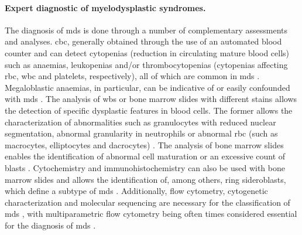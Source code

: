 \paragraph{Expert diagnostic of myelodysplastic syndromes.} The diagnosis of \ac{mds} is done through a number of complementary assessments and analyses. \Ac{cbc}, generally obtained through the use of an automated blood counter and can detect cytopenias (reduction in circulating mature blood cells) such as anaemias, leukopenias and/or thrombocytopenias (cytopenias affecting \ac{rbc}, \ac{wbc} and platelets, respectively), all of which are common in \ac{mds} \cite{Najean1989-qm,Campo2017-wi}. Megaloblastic anaemias, in particular, can be indicative of or easily confounded with \ac{mds} \cite{Kaferle2009-pl,Vasekova2016-vo,Corey2007-cs}. The analysis of \ac{wbs} or bone marrow slides with different stains allows the detection of specific dysplastic features in blood cells. The former allows the characterization of abnormalities such as granulocytes with reduced nuclear segmentation, abnormal granularity in neutrophils or abnormal \ac{rbc} (such as macrocytes, elliptocytes and dacrocytes) \cite{Campo2017-wi,Langenhuijsen1984-qx,Kuriyama1986-ts,Davey1988-zn}. The analysis of bone marrow slides enables the identification of abnormal cell maturation or an excessive count of blasts \cite{Aster2020-cu}. Cytochemistry and immunohistochemistry can also be used with bone marrow slides and allows the identification of, among others, ring sideroblasts, which define a subtype of \ac{mds} \cite{Campo2017-wi,Mufti2008-ye}. Additionally, flow cytometry, cytogenetic characterization and molecular sequencing are necessary for the classification of \ac{mds} \cite{Aster2020-cu,Porwit2014-zi,Greenberg2012-en}, with multiparametric flow cytometry being often times considered essential for the diagnosis of \ac{mds} \cite{Cremers2016-fs}.

